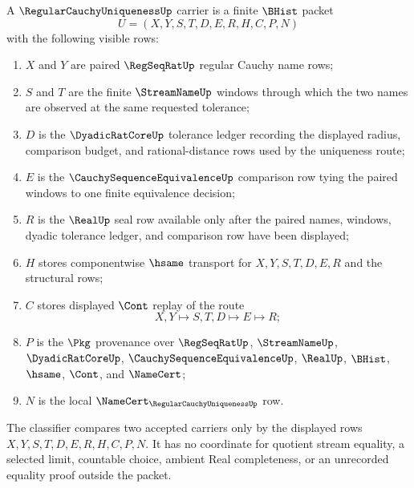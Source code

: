 \begin{definition}
\label{def:regular-cauchy-uniqueness-carrier}
A $\RegularCauchyUniquenessUp$ carrier is a finite $\BHist$ packet
$$
U=(X,Y,S,T,D,E,R,H,C,P,N)
$$
with the following visible rows:
\begin{enumerate}
\item $X$ and $Y$ are paired $\RegSeqRatUp$ regular Cauchy name rows;
\item $S$ and $T$ are the finite $\StreamNameUp$ windows through which the two names are observed at the same requested tolerance;
\item $D$ is the $\DyadicRatCoreUp$ tolerance ledger recording the displayed radius, comparison budget, and rational-distance rows used by the uniqueness route;
\item $E$ is the $\CauchySequenceEquivalenceUp$ comparison row tying the paired windows to one finite equivalence decision;
\item $R$ is the $\RealUp$ seal row available only after the paired names, windows, dyadic tolerance ledger, and comparison row have been displayed;
\item $H$ stores componentwise $\hsame$ transport for $X,Y,S,T,D,E,R$ and the structural rows;
\item $C$ stores displayed $\Cont$ replay of the route
$$
X,Y \longmapsto S,T,D \longmapsto E \longmapsto R ;
$$
\item $P$ is the $\Pkg$ provenance over $\RegSeqRatUp$, $\StreamNameUp$, $\DyadicRatCoreUp$, $\CauchySequenceEquivalenceUp$, $\RealUp$, $\BHist$, $\hsame$, $\Cont$, and $\NameCert$;
\item $N$ is the local $\NameCert_{\RegularCauchyUniquenessUp}$ row.
\end{enumerate}
The classifier compares two accepted carriers only by the displayed rows $X,Y,S,T,D,E,R,H,C,P,N$. It has no coordinate for quotient stream equality, a selected limit, countable choice, ambient Real completeness, or an unrecorded equality proof outside the packet.
\end{definition}

